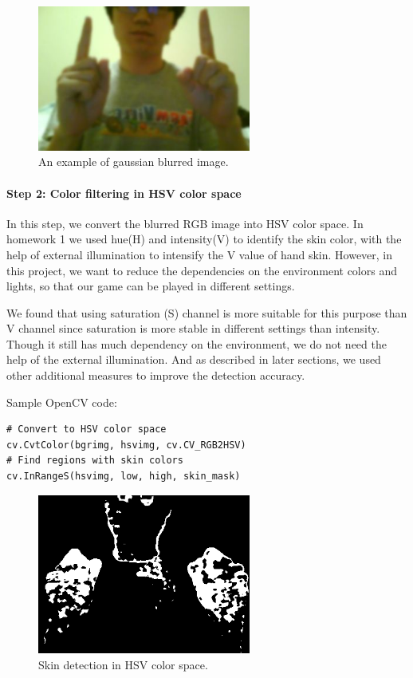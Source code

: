 \documentclass[10pt,twocolumn,letterpaper]{article}
\begin{document}
\begin{figure}[h]
\centering
\includegraphics[width=7cm]{gaussian.png}
\caption{An example of gaussian blurred image.}
\label{fig:gaussin}
\end{figure}

\paragraph{Step 2: Color filtering in HSV color space} In this step,  
we convert the blurred RGB image into HSV color space. In homework 1 we used 
hue(H) and intensity(V) to identify the skin color, with the help of external illumination 
to intensify the V value of hand skin. However, in this project, we want to reduce the 
dependencies on the environment colors and lights, so that our game can be played in different 
settings.

We found that using saturation (S) channel is more suitable for this purpose 
than V channel since saturation is more stable in different settings than intensity. 
Though it still has much dependency on the environment, we do not need the help of 
the external illumination. And as described in later sections, we used other 
additional measures to improve the detection accuracy. 

Sample OpenCV code:
\begin{verbatim}
# Convert to HSV color space
cv.CvtColor(bgrimg, hsvimg, cv.CV_RGB2HSV)
# Find regions with skin colors
cv.InRangeS(hsvimg, low, high, skin_mask)
\end{verbatim}

\begin{figure}[h]
\centering
\includegraphics[width=7cm]{hsv.png}
\caption{Skin detection in HSV color space.}
\label{fig:hsv}
\end{figure}
\end{document}
